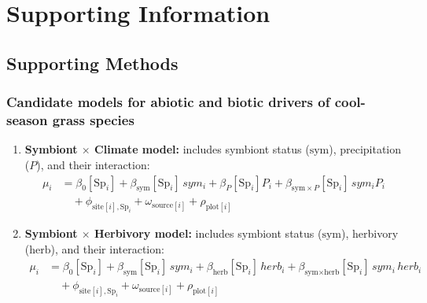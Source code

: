 \documentclass[12pt]{article}\usepackage[]{graphicx}\usepackage[dvipsnames]{xcolor}
\begin{document}
{%
\renewcommand{\theequation}{S\arabic{equation}}

\renewcommand{\figurename}{Fig}
\renewcommand{\thefigure}{S\arabic{figure}}

\renewcommand{\thetable}{S\arabic{table}}
\renewcommand{\tablename}{Table}

\section*{Supporting Information}
\subsection*{Supporting Methods}
\subsubsection {Candidate models for abiotic and biotic drivers of
cool-season grass species}
\label{sec:models}
\begin{enumerate}
    \item \textbf{Symbiont $\times$ Climate model:} includes symbiont
    status ($\text{sym}$), precipitation ($P$), and their interaction:
    \begin{align*}
    \mu_i &= \beta_0[\text{Sp}_i] + \beta_{\text{sym}}[\text{Sp}_i]\,sym_i
            + \beta_P[\text{Sp}_i] P_i
            + \beta_{\text{sym}\times P}[\text{Sp}_i]\,sym_i P_i \\
    &\quad + \phi_{\text{site}[i],\text{Sp}_i} + \omega_{\text{source}[i]}
            + \rho_{\text{plot}[i]}
    \end{align*}

    \item \textbf{Symbiont $\times$ Herbivory model:} includes symbiont
    status ($\text{sym}$), herbivory ($\text{herb}$), and their
    interaction:
    \begin{align*}
    \mu_i &= \beta_0[\text{Sp}_i] + \beta_{\text{sym}}[\text{Sp}_i]\,sym_i
            + \beta_{\text{herb}}[\text{Sp}_i]\,herb_i
            + \beta_{\text{sym}\times \text{herb}}[\text{Sp}_i]\,sym_i\,herb_i \\
    &\quad + \phi_{\text{site}[i],\text{Sp}_i} + \omega_{\text{source}[i]}
            + \rho_{\text{plot}[i]}
    \end{align*}


\end{enumerate}}
\end{document}
